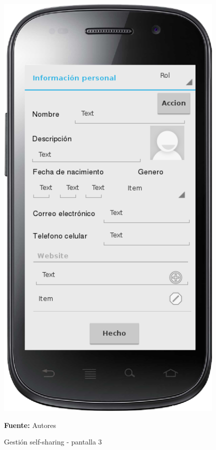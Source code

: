 \begin{figure}[!htb]
  \begin{center}
    \includegraphics[width=11cm]{./imagenes/UI/Self_sharing/self_sharing_3.png}
    \caption{Gestión self-sharing - pantalla 3}
    \label{fig:self_sharing_3}
    \textbf{Fuente:}  Autores
  \end{center}
\end{figure}

